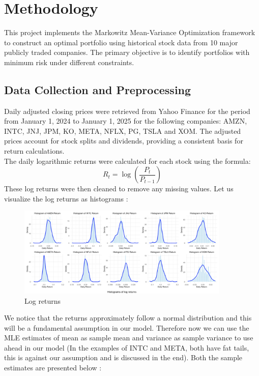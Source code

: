 \documentclass[11pt]{article}
\begin{document}
\section{Methodology}
This project implements the Markowitz Mean-Variance Optimization framework to construct an optimal portfolio using historical stock data from 10 major publicly traded companies. The primary objective is to identify portfolios with minimum risk under different constraints.

\subsection*{Data Collection and Preprocessing}
Daily adjusted closing prices were retrieved from Yahoo Finance for the period from January 1, 2024 to January 1, 2025 for the following companies: AMZN, INTC, JNJ, JPM, KO, META, NFLX, PG, TSLA and XOM. The adjusted prices account for stock splits and dividends, providing a consistent basis for return calculations. \\
The daily logarithmic returns were calculated for each stock using the formula:
\[R_t=\log \left (\frac{P_t}{P_{t-1}} \right )\]
These log returns were then cleaned to remove any missing values. Let us visualize the log returns as histograms : 

\begin{figure}[H]
    \centering
    \includegraphics[width=0.9\textwidth]{Plots_Gursimar/return_histograms.png}
    \caption{Log returns}
    \label{fig:return-histograms}
\end{figure}

We notice that the returns approximately follow a normal distribution and this will be a fundamental assumption in our model. Therefore now we can use the MLE estimates of mean as sample mean and variance as sample variance to use ahead in our model (In the examples of INTC and META, both have fat tails, this is against our assumption and is discussed in the end). Both the sample estimates are presented below : 
\end{document}
